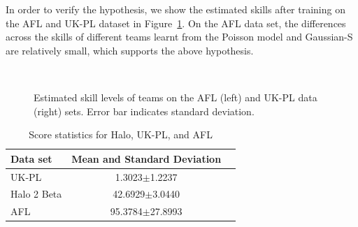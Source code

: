 \documentclass[runningheads,a4paper]{llncs}
\begin{document}
In order to verify the hypothesis, we show the estimated skills after
training on the AFL and UK-PL dataset in
Figure~\ref{fig:ResultsEstimatedSKills}. On the AFL data set, the
differences across the skills of different teams learnt from the
Poisson model and Gaussian-S are relatively small, which supports the
above hypothesis.

\begin{figure}[t!]
 \centering
 \vspace{-3cm}
 \\
 \vspace{-1.5cm}
\caption{Estimated skill levels of teams on the AFL (left) and UK-PL
  data (right) sets. Error bar indicates standard deviation.}
\label{fig:ResultsEstimatedSKills}
\end{figure}

\ENDCOMMENT


\COMMENT
\begin{table}
\caption{Score statistics for Halo, UK-PL, and AFL}
\begin{center}
\small
\begin{tabular}{|l|c|c|}
  \hline
  Data set          & Mean and Standard Deviation\\
  \hline
  UK-PL             &  1.3023$\pm$1.2237 \\
  Halo 2 Beta     & 42.6929$\pm$3.0440 \\
  AFL                 &95.3784$\pm$27.8993 \\
  \hline
\end{tabular}
\label{table:datasetStatistics}
\end{center}
\end{table}
\ENDCOMMENT
\end{document}
